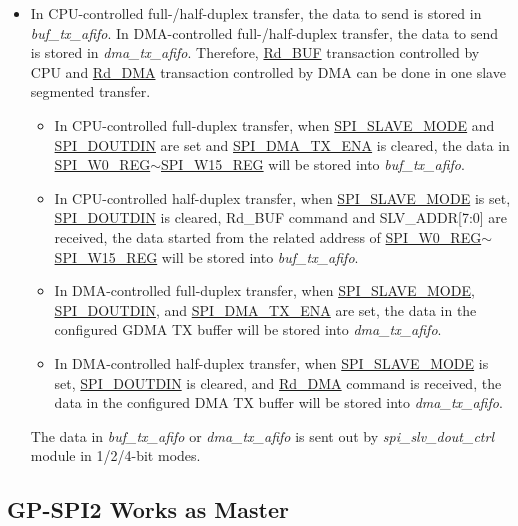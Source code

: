 \documentclass[main\_\_EN.tex]{subfiles}
\begin{document}
\begin{itemize}
\begin{itemize}
    \end{itemize}
    \item In CPU-controlled full-/half-duplex transfer, the data to send is stored in \textit{buf\_tx\_afifo}. In DMA-controlled full-/half-duplex transfer, the data to send is stored in \textit{dma\_tx\_afifo}. Therefore, \hyperref[cmd:rdbuf]{Rd\_BUF} transaction controlled by CPU and \hyperref[cmd:rddma]{Rd\_DMA} transaction controlled by DMA can be done in one slave segmented transfer.
    \begin{itemize}
        \item In CPU-controlled full-duplex transfer, when \hyperref[fielddesc:SPISLAVEMODE]{SPI\_SLAVE\_MODE} and \hyperref[fielddesc:SPIDOUTDIN]{SPI\_DOUTDIN} are set and \hyperref[fielddesc:SPIDMATXENA]{SPI\_DMA\_TX\_ENA} is cleared, the data in \hyperref[regdesc:SPIW0REG]{SPI\_W0\_REG}$\sim$\hyperref[regdesc:SPIW15REG]{SPI\_W15\_REG} will be stored into \textit{buf\_tx\_afifo}.
        \item In CPU-controlled half-duplex transfer, when \hyperref[fielddesc:SPISLAVEMODE]{SPI\_SLAVE\_MODE} is set, \hyperref[fielddesc:SPIDOUTDIN]{SPI\_DOUTDIN} is cleared, Rd\_BUF command and SLV\_ADDR[7:0] are received, the data started from the related address of \hyperref[regdesc:SPIW0REG]{SPI\_W0\_REG}$\sim$\hyperref[regdesc:SPIW15REG]{SPI\_W15\_REG} will be stored into \textit{buf\_tx\_afifo}.        
        \item In DMA-controlled full-duplex transfer, when \hyperref[fielddesc:SPISLAVEMODE]{SPI\_SLAVE\_MODE}, \hyperref[fielddesc:SPIDOUTDIN]{SPI\_DOUTDIN}, and \hyperref[fielddesc:SPIDMATXENA]{SPI\_DMA\_TX\_ENA} are set, the data in the configured GDMA TX buffer will be stored into \textit{dma\_tx\_afifo}.       
        \item In DMA-controlled half-duplex transfer, when \hyperref[fielddesc:SPISLAVEMODE]{SPI\_SLAVE\_MODE} is set, \hyperref[fielddesc:SPIDOUTDIN]{SPI\_DOUTDIN} is cleared, and \hyperref[cmd:rddma]{Rd\_DMA} command is received, the data in the configured DMA TX buffer will be stored into \textit{dma\_tx\_afifo}.
    \end{itemize}
    
The data in \textit{buf\_tx\_afifo} or \textit{dma\_tx\_afifo} is sent out by \textit{spi\_slv\_dout\_ctrl} module in 1/2/4-bit modes.
\end{itemize}

\subsection{GP-SPI2 Works as Master}\label{sec:gp-spi2-master-mode}
\end{document}
